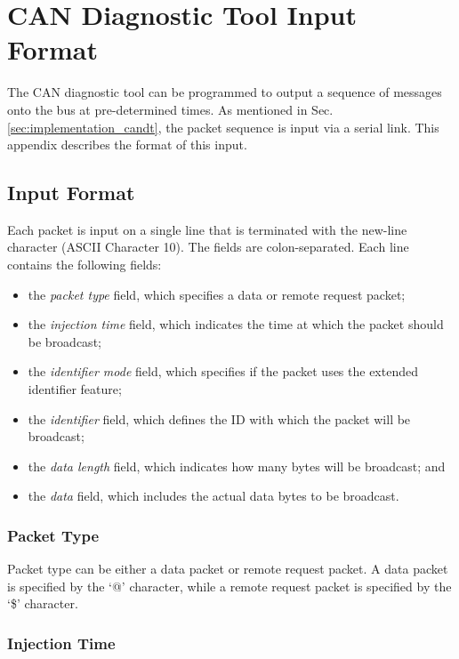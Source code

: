 
\chapter{CAN Diagnostic Tool Input Format}

The CAN diagnostic tool can be programmed to output a sequence of messages onto the bus at pre-determined times. As mentioned in Sec. \ref{sec:implementation_candt}, the packet sequence is input via a serial link. This appendix describes the format of this input.

\section*{Input Format}

Each packet is input on a single line that is terminated with the new-line character (ASCII Character 10). The fields are colon-separated. Each line contains the following fields:

\begin{itemize}
	\item the \emph{packet type} field, which specifies a data or remote request packet;
	\item the \emph{injection time} field, which indicates the time at which the packet should be broadcast;
	\item the \emph{identifier mode} field, which specifies if the packet uses the extended identifier feature;
	\item the \emph{identifier} field, which defines the ID with which the packet will be broadcast;
	\item the \emph{data length} field, which indicates how many bytes will be broadcast; and
	\item the \emph{data} field, which includes the actual data bytes to be broadcast.
\end{itemize}

\subsection*{Packet Type}

Packet type can be either a data packet or remote request packet. A data packet is specified by the `@' character, while a remote request packet is specified by the `\$' character.

\subsection*{Injection Time}

